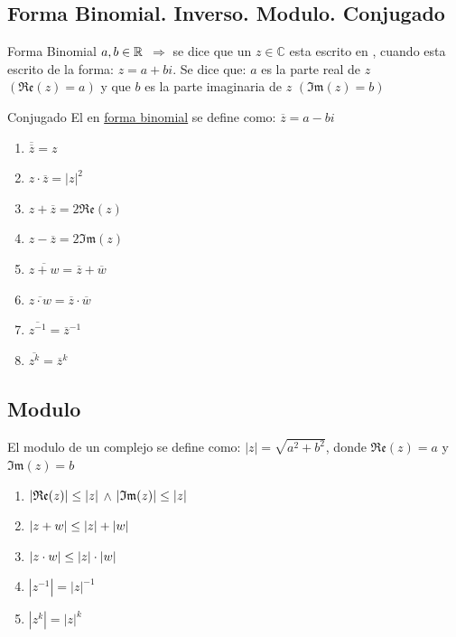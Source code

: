 \documentclass[10pt]{article}
\begin{document}
\begin{center}
\subsection{Forma Binomial. Inverso. Modulo. Conjugado} 
\end{center}

\begin{defi}{Forma Binomial}
$a, b \in \mathbb{R}^{}$ $\Rightarrow$ se dice que un $z \in \mathbb{C}$ esta escrito en , cuando esta escrito de la forma: $z = a+bi$.
Se dice que: $a$ es la parte real de $z$ $\left( \mathfrak{Re}(z) = a\right)$ y que $b$ es la parte imaginaria de $z$ $\left( \mathfrak{Im}(z) = b\right)$  
\end{defi}


\begin{defi}{Conjugado}
El  en \underline{forma binomial} se define como: $\overline{z} = a - bi$
\end{defi}

\begin{prop}
\begin{enumerate}
\item $\overline{\overline{z}} = z$
\item $z \cdot \overline{z} = |z|^2$
\item $z + \overline{z} = 2 \mathfrak{Re}(z)$
\item $z - \overline{z} = 2 \mathfrak{Im}(z)$
\item $\overline{z+w} = \overline{z} + \overline{w}$
\item $\overline{z \cdot w} = \overline{z} \cdot \overline{w}$
\item $\overline{z^{-1}} = \overline{z}^{-1}  $
\item $\overline{z^{k}} = \overline{z}^{k}  $
\end{enumerate}
\end{prop}

\begin{center}
\subsection{Modulo} 
\end{center}

El modulo de un complejo se define como: $|z| = \sqrt{a^2 + b^2}$, donde $\mathfrak{Re}(z) = a$ y $\mathfrak{Im}(z) = b$

\begin{prop}
\begin{enumerate}
\item $|\mathfrak{Re}(z)| \leq |z|$ \hspace{0.2cm} $\land$ \hspace{0.2cm} $|\mathfrak{Im}(z)| \leq |z|$
\item $|z+w| \leq |z| + |w|$
\item $|z \cdot w| \leq |z| \cdot |w|$
\item $|z^{-1}|= |z|^{-1}$
\item $|z^{k}|= |z|^{k}$
\end{enumerate}
\end{prop}
\end{document}
